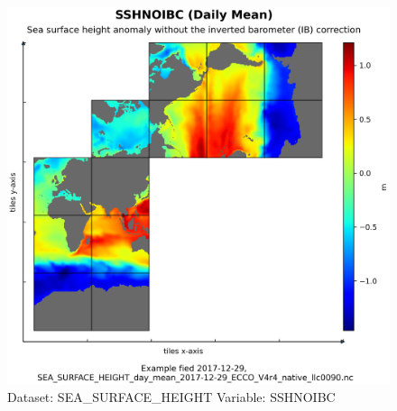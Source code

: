 \begin{figure}[H]
\centering
\includegraphics[width=\textwidth]{../images/plots/native_plots/Sea_Surface_Height/SSHNOIBC.png}
\caption{Dataset: SEA\_SURFACE\_HEIGHT Variable: SSHNOIBC}
\label{tab:table-SEA_SURFACE_HEIGHT_SSHNOIBC-Plot}
\end{figure}